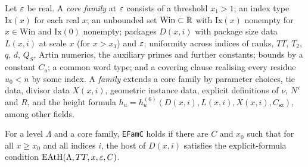 \begin{definition}[families]\label{geoa:famcore}
Let $\varepsilon$ be real. A \emph{core family} at $\varepsilon$ consists of a threshold $x_1>1$; an
index type $\mathrm{Ix}(x)$ for each real $x$; an unbounded set $\mathrm{Win}\subset\mathbb{R}$
with $\mathrm{Ix}(x)$ nonempty for $x\in\mathrm{Win}$ and $\mathrm{Ix}(0)$ nonempty;
packages $D(x,i)$ with package size data $L(x,i)$ at scale $x$ (for $x>x_1$) and $\varepsilon$;
uniformity across indices of ranks, $TT$, $T_2$, $q$, $d$, $Q_S$, Artin numerics, the
auxiliary primes and further constants; bounds by a constant $C_o$; a common word type;
and a covering clause realising every residue $u_0<n$ by some index. A \emph{family}
extends a core family by parameter choices, tie data, divisor data $X(x,i)$, geometric
instance data, explicit definitions of $\nu$, $N'$ and $R$, and the height formula
$h_u=h^{(6)}_u(D(x,i),L(x,i),X(x,i),C_{\mathrm{sz}})$, among other fields.
\end{definition}

\begin{definition}\label{geoa:efamc}
For a level $\Lambda$ and a core family, \texttt{EFamC} holds if there are $C$ and $x_0$
such that for all $x\ge x_0$ and all indices $i$, the host of $D(x,i)$ satisfies the
explicit-formula condition $\mathrm{EAtH}(\Lambda,TT,x,\varepsilon,C)$.
\end{definition}

